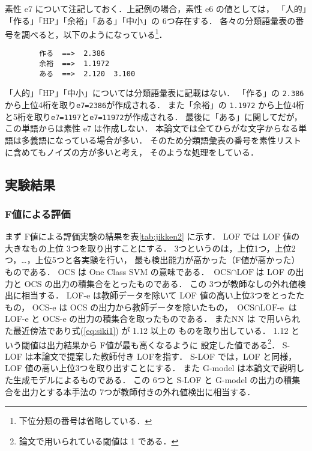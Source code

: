 \documentclass[japanese]{jnlp_1.4}
\begin{document}
素性 e7 について注記しておく．上記例の場合，素性 e6 の値としては，
「人的」「作る」「HP」「余裕」「ある」「中小」の 6つ存在する．
各々の分類語彙表の番号を調べると，以下のようになっている\footnote{下位分類の番号は省略している．}．

\begin{verbatim}
        作る  ==>  2.386
        余裕  ==>  1.1972
        ある  ==>  2.120  3.100
\end{verbatim}

「人的」「HP」「中小」については分類語彙表に記載はない．
「作る」の \verb|2.386| から上位4桁を取り\verb|e7=2386|が作成される．
また「余裕」の \verb|1.1972| から上位4桁と5桁を取り\verb|e7=1197|と\verb|e7=11972|が作成される．
最後に「ある」に関してだが，この単語からは素性 e7 は作成しない．
本論文では全てひらがな文字からなる単語は多義語になっている場合が多い．
そのため分類語彙表の番号を素性リストに含めてもノイズの方が多いと考え，
そのような処理をしている．


\subsection{実験結果}

\subsubsection{F値による評価} 

まず F値による評価実験の結果を表\ref{tab:jikken2} に示す．
LOF では LOF 値の大きなもの上位 3つを取り出すことにする．
3つというのは，上位1つ，上位2つ，…，上位5つと各実験を行い，
最も検出能力が高かった（F値が高かった）ものである．
OCS は One Class SVM の意味である．
$\text{OCS}\cap\text{LOF}$は LOF の出力と OCS の出力の積集合をとったものである\cite{shinnou-lrec2010}．
この 3つが教師なしの外れ値検出に相当する．
LOF-e は教師データを除いて LOF 値の高い上位3つをとったたもの，
OCS-e は OCS の出力から教師データを除いたもの，
$\text{OCS}\cap\text{LOF-e}$ は LOF-e と OCS-e の出力の積集合を取ったものである．
またNN は \cite{erk} で用いられた最近傍法であり式(\ref{eq:siki1}) が 1.12 以上の
ものを取り出している．
1.12 という閾値は出力結果から F値が最も高くなるように
設定した値である\footnote{論文\cite{erk}で用いられている閾値は 1 である．}．
S-LOF は本論文で提案した教師付き LOFを指す．
S-LOF では，LOF と同様，LOF 値の高い上位3つを取り出すことにする．
また G-model は本論文で説明した生成モデルによるものである．
この 6つと S-LOF と G-model の出力の積集合を出力とする本手法の 
7つが教師付きの外れ値検出に相当する．
\end{document}
